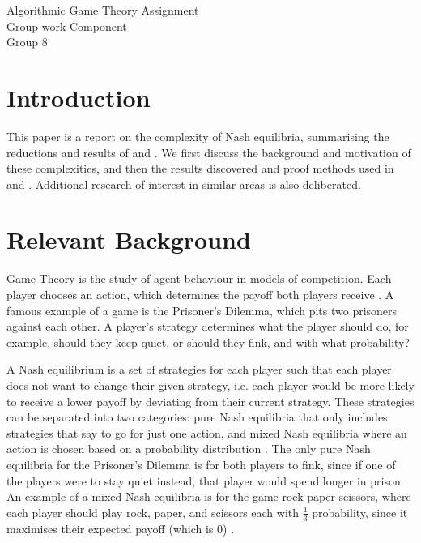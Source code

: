 \documentclass{article}
\begin{document}
\begin{center}
	\LARGE{Algorithmic Game Theory Assignment}\\[0.1cm]
	\Large{Group work Component}\\[0.1cm]
	Group 8\\[0.1cm]
\end{center}
\vspace{0.8cm}

\begin{multicols}{2}
\section{Introduction}
This paper is a report on the complexity of Nash equilibria, summarising the reductions and results of \cite{Daskalakis.2009} and \cite{Fabrikant.2004}. We first discuss the background and motivation of these complexities, and then the results discovered and proof methods used in \cite{Daskalakis.2009} and \cite{Fabrikant.2004}. Additional research of interest in similar areas is also deliberated.
\section{Relevant Background}
Game Theory is the study of agent behaviour in models of competition. Each player chooses an action, which determines the payoff both players receive \cite{OsborneMartinJ..2011}. A famous example of a game is the Prisoner’s Dilemma, which pits two prisoners against each other. A player’s strategy determines what the player should do, for example, should they keep quiet, or should they fink, and with what probability?

A Nash equilibrium is a set of strategies for each player such that each player does not want to change their given strategy, i.e. each player would be more likely to receive a lower payoff by deviating from their current strategy. These strategies can be separated into two categories: pure Nash equilibria that only includes strategies that say to go for just one action, and mixed Nash equilibria where an action is chosen based on a probability distribution \cite{OsborneMartinJ..2011}. The only pure Nash equilibria for the Prisoner’s Dilemma is for both players to fink, since if one of the players were to stay quiet instead, that player would spend longer in prison. An example of a mixed Nash equilibria is for the game rock-paper-scissors, where each player should play rock, paper, and scissors each with $\frac{1}{3}$ probability, since it maximises their expected payoff (which is 0) \cite{Daskalakis.2009}.


\end{multicols}
\end{document}

